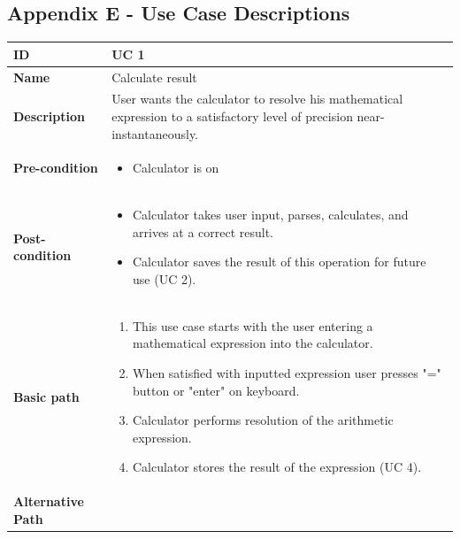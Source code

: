 \documentclass[a4paper, 12pt]{article}
\begin{document}
\subsection{Appendix E - Use Case Descriptions}

\begin{table}[!h]
\begin{tabular}{|p{3cm}|p{9cm}|}
\hline
\textbf{ID} & UC 1  \\ \hline
\textbf{Name} & Calculate result  \\ \hline
\textbf{Description} & User wants the calculator to resolve his mathematical expression to a satisfactory level of precision near-instantaneously.  \\ \hline
\textbf{Pre-condition} &
	\begin{itemize}
		\vspace{-2mm}
		\item Calculator is on
		\vspace{-3.5mm}
	\end{itemize}  \\ \hline
\textbf{Post-condition} &
	\begin{itemize}
		\vspace{-2mm}
		\item Calculator takes user input, parses, calculates, and arrives at a correct result.
		\item Calculator saves the result of this operation for future use (UC 2).
		\vspace{-3.5mm}
	\end{itemize}  \\ \hline
\textbf{Basic path} &
	\begin{enumerate}
		\vspace{-2mm}
		\item This use case starts with the user entering a mathematical expression into the calculator.
		\item When satisfied with inputted expression user presses "=" button or "enter" on keyboard.
		\item Calculator performs resolution of the arithmetic expression.
		\item Calculator stores the result of the expression (UC 4).
		\vspace{-3.5mm}
	\end{enumerate}  \\ \hline
\textbf{Alternative Path} &
	\begin{itemize}[leftmargin=6mm]
		\vspace{-2mm}

\end{itemize}
\end{tabular}
\end{table}
\end{document}
